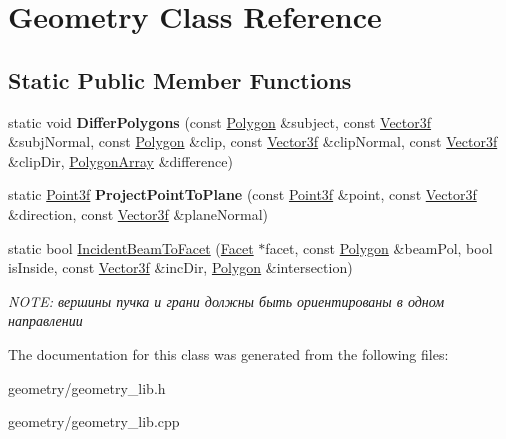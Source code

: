 \hypertarget{class_geometry}{}\section{Geometry Class Reference}
\label{class_geometry}
\subsection*{Static Public Member Functions}
\begin{DoxyCompactItemize}
\item 
\mbox{\label{class_geometry_a24e8526f076d17a32223293ecb4a2ba8}} 
static void {\bfseries Differ\+Polygons} (const \mbox{\hyperlink{class_polygon}{Polygon}} \&subject, const \mbox{\hyperlink{struct_point3f}{Vector3f}} \&subj\+Normal, const \mbox{\hyperlink{class_polygon}{Polygon}} \&clip, const \mbox{\hyperlink{struct_point3f}{Vector3f}} \&clip\+Normal, const \mbox{\hyperlink{struct_point3f}{Vector3f}} \&clip\+Dir, \mbox{\hyperlink{class_polygon_array}{Polygon\+Array}} \&difference)
\item 
\mbox{\label{class_geometry_a16820dba38e8321596184a40664f2d3f}} 
static \mbox{\hyperlink{struct_point3f}{Point3f}} {\bfseries Project\+Point\+To\+Plane} (const \mbox{\hyperlink{struct_point3f}{Point3f}} \&point, const \mbox{\hyperlink{struct_point3f}{Vector3f}} \&direction, const \mbox{\hyperlink{struct_point3f}{Vector3f}} \&plane\+Normal)
\item 
\mbox{\label{class_geometry_a06b703e4b24a60a745c9c9d82f58c3d4}} 
static bool \mbox{\hyperlink{class_geometry_a06b703e4b24a60a745c9c9d82f58c3d4}{Incident\+Beam\+To\+Facet}} (\mbox{\hyperlink{class_facet}{Facet}} $\ast$facet, const \mbox{\hyperlink{class_polygon}{Polygon}} \&beam\+Pol, bool is\+Inside, const \mbox{\hyperlink{struct_point3f}{Vector3f}} \&inc\+Dir, \mbox{\hyperlink{class_polygon}{Polygon}} \&intersection)
\begin{DoxyCompactList}\small\item\em N\+O\+TE\+: вершины пучка и грани должны быть ориентированы в одном направлении \end{DoxyCompactList}\end{DoxyCompactItemize}


The documentation for this class was generated from the following files\+:\begin{DoxyCompactItemize}
\item 
geometry/geometry\+\_\+lib.\+h\item 
geometry/geometry\+\_\+lib.\+cpp\end{DoxyCompactItemize}
